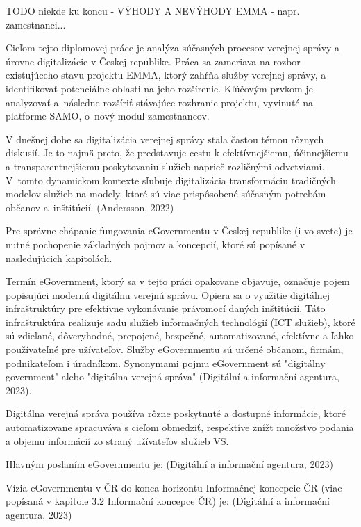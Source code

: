 \TODO
TODO niekde ku koncu - VÝHODY A NEVÝHODY EMMA - napr. zamestnanci...

Cieľom tejto diplomovej práce je analýza súčasných procesov verejnej správy a úrovne digitalizácie v Českej republike. Práca sa zameriava na rozbor existujúceho stavu projektu EMMA, ktorý zahŕňa služby verejnej správy, a identifikovať potenciálne oblasti na jeho rozšírenie. Kľúčovým prvkom je analyzovať a~následne rozšíriť stávajúce rozhranie projektu, vyvinuté na platforme SAMO, o~nový modul zamestnancov. 

V dnešnej dobe sa digitalizácia verejnej správy stala častou témou rôznych diskusií. Je to najmä preto, že predstavuje cestu k efektívnejšiemu, účinnejšiemu a transparentnejšiemu poskytovaniu služieb naprieč rozličnými odvetviami. \zlom V~tomto dynamickom kontexte sľubuje digitalizácia transformáciu tradičných modelov služieb na modely, ktoré sú viac prispôsobené súčasným potrebám občanov a~inštitúcií. \scr(Andersson, 2022)

Pre správne chápanie fungovania eGovernmentu v Českej republike (i vo svete) je nutné pochopenie základných pojmov a koncepcií, ktoré sú popísané v nasledujúcich kapitolách.

Termín eGovernment,  ktorý sa v tejto práci opakovane objavuje, označuje pojem popisujúci modernú digitálnu verejnú správu. Opiera sa o využitie digitálnej infraštruktúry pre efektívne vykonávanie právomocí daných inštitúcií. Táto infraštruktúra realizuje sadu služieb informačných technológií (ICT služieb), ktoré sú zdieľané, dôveryhodné, prepojené, bezpečné, automatizované, efektívne a ľahko používateľné pre užívateľov. Služby eGovernmentu sú určené občanom, firmám, podnikateľom i úradníkom. Synonymami pojmu eGovernment sú "digitálny government" alebo "digitálna verejná správa" \scr(Digitální a informační agentura, 2023).

Digitálna verejná správa používa rôzne poskytnuté a dostupné informácie, ktoré automatizovane spracuváva s cieľom obmedziť, respektíve znížt množstvo podania a objemu informácií zo straný užívateľov služieb VS.

Hlavným poslaním eGovernmentu je:  \scr(Digitální a informační agentura, 2023)

Vízia eGovernmentu v ČR do konca horizontu Informačnej koncepcie ČR (viac popísaná v kapitole 3.2 Informační koncepce ČR) je:  \scr(Digitální a informační agentura, 2023)

